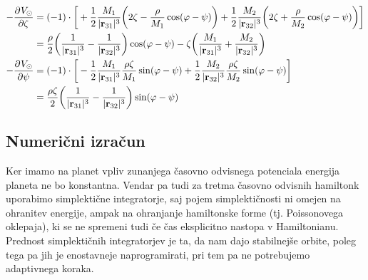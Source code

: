 \documentclass[12pt, a4paper]{article}
\renewcommand{\r}{
    \ensuremath{\mathbf{r}}
}
\newcommand{\der}[3][]{
    \ensuremath{ \frac{\partial^{#1} #2}{\partial #3^{#1}} }
}
\begin{document}
\begin{align}
    -\der{V_\odot}{\zeta} &= (-1)\cdot\bigg[+\frac{1}{2}\frac{M_1}{|\r_{31}|^3}\bigg(2\zeta -
        \frac{\rho}{M_1}\cos(\varphi - \psi)\bigg) + \frac{1}{2}\frac{M_2}{|\r_{32}|^3}
        \bigg(2\zeta + \frac{\rho}{M_2}\cos(\varphi - \psi)\bigg)\bigg] \notag \\
    &= \frac{\rho}{2}\bigg(\frac{1}{|\r_{31}|^3} - \frac{1}{|\r_{32}|^3}\bigg)\cos(\varphi - \psi) -
        \zeta\bigg(\frac{M_1}{|\r_{31}|^3} + \frac{M_2}{|\r_{32}|^3}\bigg) \\
        -\der{V_\odot}{\psi} &= (-1)\cdot\bigg[-\frac{1}{2}\frac{M_1}{|\r_{31}|^3}\frac{\rho\zeta}{M_1}\sin(\varphi - \psi)
        + \frac{1}{2}\frac{M_2}{|\r_{32}|^3}\frac{\rho\zeta}{M_2}\sin(\varphi - \psi) \bigg] \notag \\
    &= \frac{\rho\zeta}{2}\bigg(\frac{1}{|\r_{31}|^3} - \frac{1}{|\r_{32}|^3}\bigg)\sin(\varphi - \psi)
\end{align}

\subsection{Numeri\v cni izra\v cun}
Ker imamo na planet vpliv zunanjega \v casovno odvisnega potenciala energija planeta ne bo konstantna. Vendar pa
tudi za tretma \v casovno odvisnih hamiltonk uporabimo simplekti\v cne integratorje, saj pojem simplekti\v cnosti
ni omejen na ohranitev energije, ampak na ohranjanje hamiltonske forme (tj. Poissonovega oklepaja), ki se ne
spremeni tudi \v ce \v cas eksplicitno nastopa v Hamiltonianu. Prednost simplekti\v cnih integratorjev je ta, da
nam dajo stabilnej\v se orbite, poleg tega pa jih je enostavneje naprogramirati, pri tem pa ne potrebujemo
adaptivnega koraka.
\end{document}
